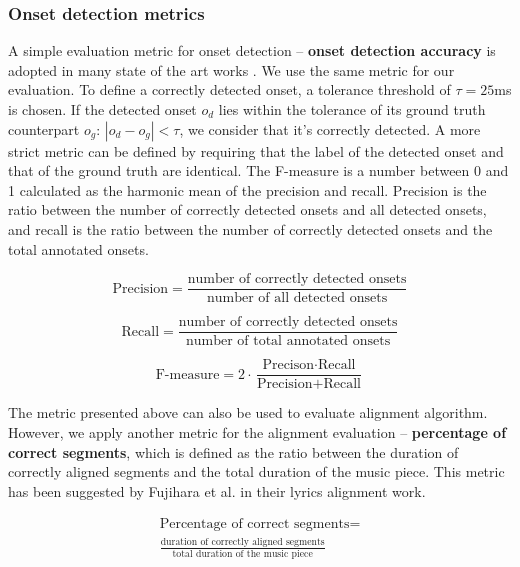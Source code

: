 \subsubsection{Onset detection metrics}\label{sec:ch2:onset_detection_metrics}

A simple evaluation metric for onset detection -- \textbf{onset detection accuracy} is adopted in many state of the art works . We use the same metric for our evaluation. To define a correctly detected onset, a tolerance threshold of $\tau=25$ms is chosen. If the detected onset $o_d$ lies within the tolerance of its ground truth counterpart $o_g$: $|o_d-o_g|<\tau$, we consider that it's correctly detected. A more strict metric can be defined by requiring that the label of the detected onset and that of the ground truth are identical. The F-measure is a number between 0 and 1 calculated as the harmonic mean of the precision and recall. Precision is the ratio between the number of correctly detected onsets and all detected onsets, and recall is the ratio between the number of correctly detected onsets and the total annotated onsets.

\begin{equation}
\textrm{Precision} = \frac{\textrm{number of correctly detected onsets}}{\textrm{number of all detected onsets}}
\end{equation}

\begin{equation}
\textrm{Recall} = \frac{\textrm{number of correctly detected onsets}}{\textrm{number of total annotated onsets}}
\end{equation}

\begin{equation}
\textrm{F-measure} = 2 \cdot \frac{\textrm{Precison} \cdot \textrm{Recall}}{\textrm{Precision} + \textrm{Recall}}
\end{equation}

The metric presented above can also be used to evaluate alignment algorithm. However, we apply another metric for the alignment evaluation -- \textbf{percentage of correct segments}, which is defined as the ratio between the duration of correctly aligned segments and the total duration of the music piece. This metric has been suggested by Fujihara et al.  in their lyrics alignment work.

\begin{equation}
\begin{split}
\textrm{Percentage of correct segments} =\\\frac{\textrm{duration of correctly aligned segments}}{\textrm{total duration of the music piece}}
\end{split}
\end{equation}

